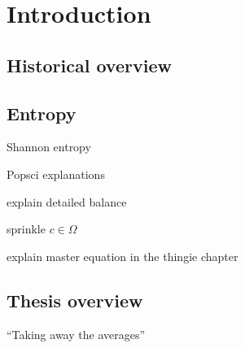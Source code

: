 \chapter{Introduction}

\section{Historical overview}




\section{Entropy}

Shannon entropy

Popsci explanations

explain detailed balance

sprinkle \(c\in\Omega\)

explain master equation in the thingie chapter


\section{Thesis overview}

``Taking away the averages''

